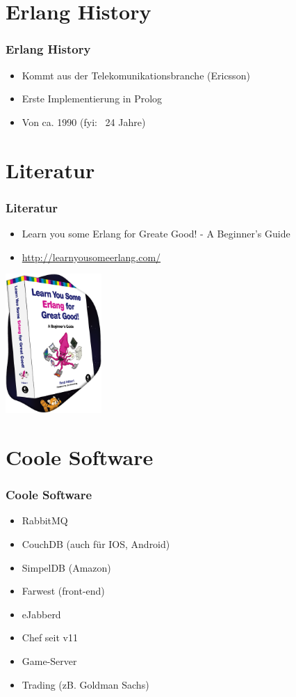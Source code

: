 \section{Erlang History}
\begin{frame} %
  \frametitle{Erlang History} %
  \begin{itemize} %
    \item Kommt aus der Telekomunikationsbranche (Ericsson)
    \item Erste Implementierung in Prolog
    \item Von ca. 1990 (fyi: ~24 Jahre)
  \end{itemize}
\end{frame}

\section{Literatur}
\begin{frame} %
  \frametitle{Literatur} %
  \begin{itemize} %
    \item Learn you some Erlang for Greate Good! - A Beginner's Guide
    \item \url{http://learnyousomeerlang.com/}
  \end{itemize}
  \includegraphics[height=200px]{img/splash-book}
\end{frame}

\section{Coole Software}
\begin{frame} %
  \frametitle{Coole Software} %
  \begin{itemize} %
    \item RabbitMQ
    \item CouchDB (auch für IOS, Android)
    \item SimpelDB (Amazon)
    \item Farwest (front-end)
    \item eJabberd
    \item Chef seit v11 
    \item Game-Server
    \item Trading (zB. Goldman Sachs)
  \end{itemize}
\end{frame}


